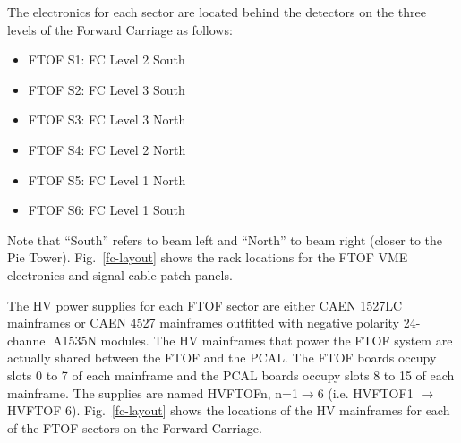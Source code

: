 \documentclass[12pt]{article}
\begin{document}
The electronics for each sector are located behind the detectors on the three levels of the Forward 
Carriage as follows:

\vskip 0.5cm

\begin{minipage}{0.5\textwidth}
\begin{itemize}
\item FTOF S1: FC Level 2 South
\item FTOF S2: FC Level 3 South
\item FTOF S3: FC Level 3 North
\end{itemize}
\end{minipage}
\begin{minipage}{0.5\textwidth}
\begin{itemize}
\item FTOF S4: FC Level 2 North
\item FTOF S5: FC Level 1 North
\item FTOF S6: FC Level 1 South
\end{itemize}
\end{minipage}

\vskip 0.5cm

Note that ``South'' refers to beam left and ``North'' to beam right (closer to the Pie Tower). 
Fig.~\ref{fc-layout} shows the rack locations for the FTOF VME electronics and signal cable patch 
panels. 

The HV power supplies for each FTOF sector are either CAEN 1527LC mainframes or CAEN 4527 mainframes 
outfitted with negative polarity 24-channel A1535N modules. The HV mainframes that power the FTOF 
system are actually shared between the FTOF and the PCAL. The FTOF boards occupy slots 0 to 7 of each 
mainframe and the PCAL boards occupy slots 8 to 15 of each mainframe. The supplies are named HVFTOFn, 
n=1$\to$6 (i.e. HVFTOF1 $\to$ HVFTOF 6). Fig.~\ref{fc-layout} shows the locations of the HV mainframes 
for each of the FTOF sectors on the Forward Carriage.
\end{document}
